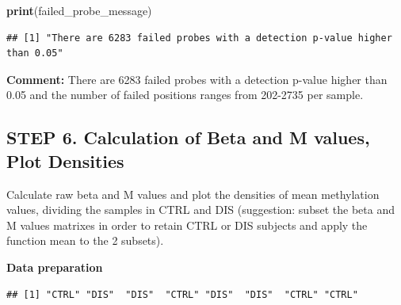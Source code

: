 \documentclass[
  11pt,
]{article}
\newenvironment{Shaded}{\begin{snugshade}}{\end{snugshade}}
\newcommand{\AttributeTok}[1]{\textcolor[rgb]{0.13,0.29,0.53}{#1}}
\newcommand{\ConstantTok}[1]{\textcolor[rgb]{0.56,0.35,0.01}{#1}}
\newcommand{\FunctionTok}[1]{\textcolor[rgb]{0.13,0.29,0.53}{\textbf{#1}}}
\newcommand{\NormalTok}[1]{#1}
\newcommand{\OtherTok}[1]{\textcolor[rgb]{0.56,0.35,0.01}{#1}}
\newcommand{\SpecialCharTok}[1]{\textcolor[rgb]{0.81,0.36,0.00}{\textbf{#1}}}
\newcommand{\StringTok}[1]{\textcolor[rgb]{0.31,0.60,0.02}{#1}}
\begin{document}
\begin{Shaded}
\begin{Highlighting}[]
\FunctionTok{print}\NormalTok{(failed\_probe\_message)}
\end{Highlighting}
\end{Shaded}

\begin{verbatim}
## [1] "There are 6283 failed probes with a detection p-value higher than 0.05"
\end{verbatim}

\textbf{Comment:} There are 6283 failed probes with a detection p-value
higher than 0.05 and the number of failed positions ranges from 202-2735
per sample.

\subsection{STEP 6. Calculation of Beta and M values, Plot
Densities}\label{step-6.-calculation-of-beta-and-m-values-plot-densities}

Calculate raw beta and M values and plot the densities of mean
methylation values, dividing the samples in CTRL and DIS (suggestion:
subset the beta and M values matrixes in order to retain CTRL or DIS
subjects and apply the function mean to the 2 subsets).

\textbf{Data preparation}

\begin{Shaded}
\end{Shaded}

\begin{verbatim}
## [1] "CTRL" "DIS"  "DIS"  "CTRL" "DIS"  "DIS"  "CTRL" "CTRL"
\end{verbatim}
\end{document}
